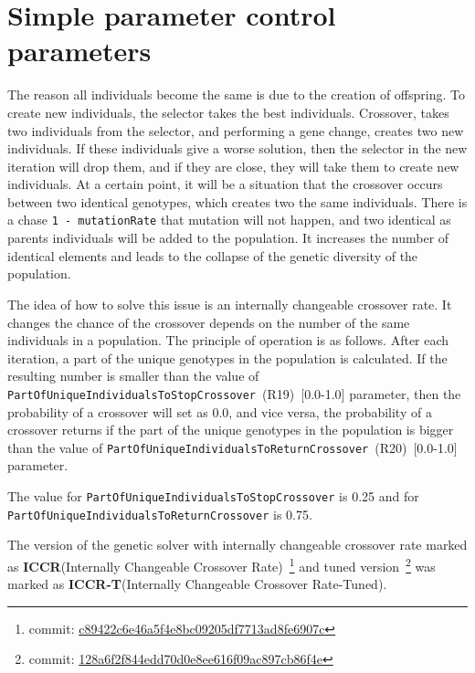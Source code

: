 \section{Simple parameter control parameters}

The reason all individuals become the same is due to the creation of offspring. To create new individuals, the selector takes the best individuals. Crossover, takes two individuals from the selector, and performing a gene change, creates two new individuals. If these individuals give a worse solution, then the selector in the new iteration will drop them, and if they are close, they will take them to create new individuals. At a certain point, it will be a situation that the crossover occurs between two identical genotypes, which creates two the same individuals. There is a chase \texttt{1~-~mutationRate} that mutation will not happen, and two identical as parents individuals will be added to the population. It increases the number of identical elements and leads to the collapse of the genetic diversity of the population.

The idea of how to solve this issue is an internally changeable crossover rate. It changes the chance of the crossover depends on the number of the same individuals in a population. 
The principle of operation is as follows. After each iteration, a part of the unique genotypes in the population is calculated. If the resulting number is smaller than the value of \texttt{PartOfUniqueIndividualsToStopCrossover}~(R19)~[0.0-1.0] parameter, then the probability of a crossover will set as 0.0, and vice versa, the probability of a crossover returns if the part of the unique genotypes in the population is bigger than the value of \texttt{PartOfUniqueIndividualsToReturnCrossover}~(R20)~[0.0-1.0] parameter.

The value for \texttt{PartOfUniqueIndividualsToStopCrossover} is 0.25 and for \texttt{PartOfUniqueIndividualsToReturnCrossover} is 0.75.

The version of the genetic solver with internally changeable crossover rate marked as \textbf{ICCR}(Internally Changeable Crossover Rate)~\footnote{commit: \href{https://git-st.inf.tu-dresden.de/mquat/mquat2/commit/c89422c6e46a5f4e8bc09205df7713ad8fe6907c}{c89422c6e46a5f4e8bc09205df7713ad8fe6907c}} and tuned version~\footnote{commit: \href{https://git-st.inf.tu-dresden.de/mquat/mquat2/commit/128a6f2f844edd70d0e8ee616f09ac897cb86f4e}{128a6f2f844edd70d0e8ee616f09ac897cb86f4e}} was marked as \textbf{ICCR-T}(Internally Changeable Crossover Rate-Tuned).

